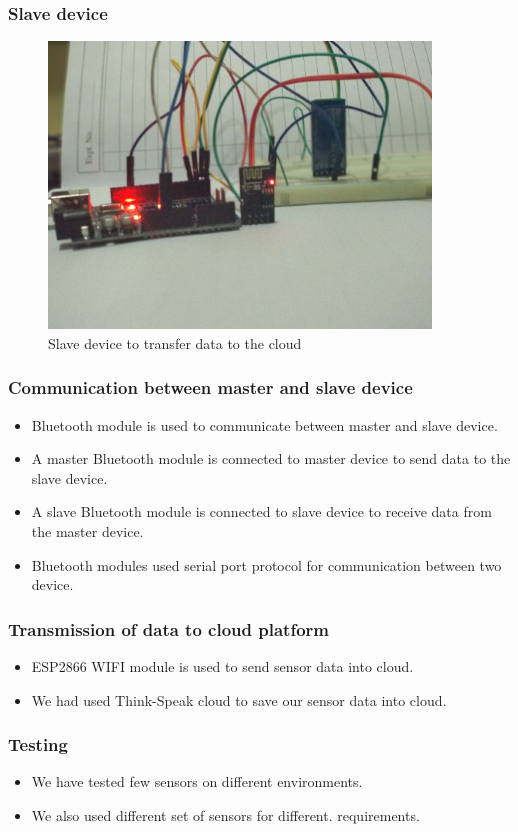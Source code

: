 \documentclass{beamer}
\begin{document}
\begin{frame}\frametitle{Slave  device}
\begin{itemize}
  \begin{figure}[H]
  \centerline{\includegraphics[width=4.0in]{slave22}}
  \caption{ \textbf{}Slave device to transfer data to the cloud}
  \end{figure}
\end{itemize}
\end{frame}
\begin{frame}\frametitle{Communication between master and slave device}
\begin{itemize}
\item Bluetooth module is used to communicate between master and slave device.
\item A master Bluetooth module is connected to master device to send data to the slave device. 
\item A slave Bluetooth module is connected to slave device to receive data from the master device.
\item Bluetooth modules used serial port protocol for communication between two device.
\end{itemize}
\end{frame}
\begin{frame}\frametitle{Transmission of data to cloud platform}
\begin{itemize}
\item ESP2866 WIFI module is used to send sensor data into cloud. 
\item We had used Think-Speak cloud to save our sensor data into cloud.
\end{itemize}
\end{frame}
\begin{frame}\frametitle{Testing}
\begin{itemize}
\item We have tested few sensors on different environments.
\item We also used different set of sensors for different. requirements.  
\end{itemize}
\end{frame}
\end{document}
